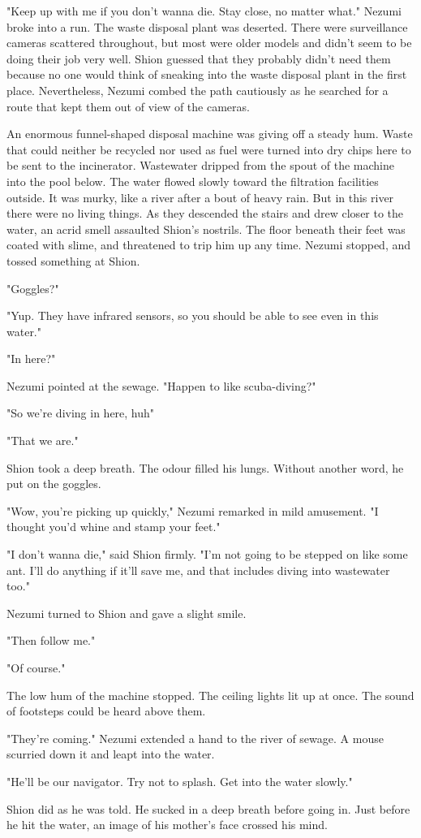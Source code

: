 "Keep up with me if you don't wanna die. Stay close, no matter what."
Nezumi broke into a run. The waste disposal plant was deserted. There
were surveillance cameras scattered throughout, but most were older
models and didn't seem to be doing their job very well. Shion guessed
that they probably didn't need them because no one would think of
sneaking into the waste disposal plant in the first place. Nevertheless,
Nezumi combed the path cautiously as he searched for a route that kept
them out of view of the cameras.

An enormous funnel-shaped disposal machine was giving off a steady hum.
Waste that could neither be recycled nor used as fuel were turned into
dry chips here to be sent to the incinerator. Wastewater dripped from
the spout of the machine into the pool below. The water flowed slowly
toward the filtration facilities outside. It was murky, like a river
after a bout of heavy rain. But in this river there were no living
things. As they descended the stairs and drew closer to the water, an
acrid smell assaulted Shion's nostrils. The floor beneath their feet was
coated with slime, and threatened to trip him up any time. Nezumi
stopped, and tossed something at Shion.

"Goggles?"

"Yup. They have infrared sensors, so you should be able to see even in
this water."

"In here?"

Nezumi pointed at the sewage. "Happen to like scuba-diving?"

"So we're diving in here, huh\el "

"That we are."

Shion took a deep breath. The odour filled his lungs. Without another
word, he put on the goggles.

"Wow, you're picking up quickly," Nezumi remarked in mild amusement. "I
thought you'd whine and stamp your feet."

"I don't wanna die," said Shion firmly. "I'm not going to be stepped on
like some ant. I'll do anything if it'll save me, and that includes
diving into wastewater too."

Nezumi turned to Shion and gave a slight smile.

"Then follow me."

"Of course."

The low hum of the machine stopped. The ceiling lights lit up at once.
The sound of footsteps could be heard above them.

"They're coming." Nezumi extended a hand to the river of sewage. A mouse
scurried down it and leapt into the water.

"He'll be our navigator. Try not to splash. Get into the water slowly."

Shion did as he was told. He sucked in a deep breath before going in.
Just before he hit the water, an image of his mother's face crossed his
mind.